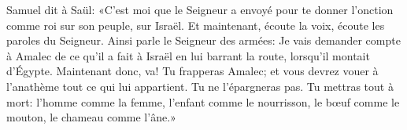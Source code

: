Samuel dit à Saül:
	«C’est moi que le Seigneur a envoyé
		pour te donner l’onction comme roi sur son peuple, sur Israël.
Et maintenant, écoute la voix, écoute les paroles du Seigneur.
Ainsi parle le Seigneur des armées:
	Je vais demander compte à Amalec de ce qu’il a fait à Israël
	en lui barrant la route, lorsqu’il montait d’Égypte.
Maintenant donc, va! Tu frapperas Amalec;
	et vous devrez vouer à l’anathème tout ce qui lui appartient.
Tu ne l’épargneras pas. Tu mettras tout à mort:
	l’homme comme la femme, l’enfant comme le nourrisson,
	le bœuf comme le mouton, le chameau comme l’âne.»
